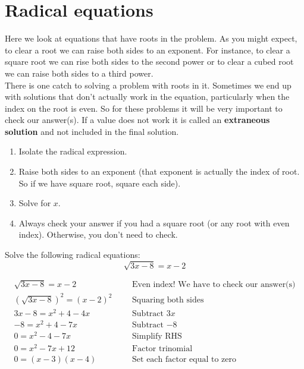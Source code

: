 \section{Radical equations}
Here we look at equations that have roots in the problem. As you might expect, to clear a root we can raise both sides to an exponent. For instance, to clear a square root
we can rise both sides to the second power or to clear a cubed root we can raise both sides to a third power. \\
There is one catch to solving a problem with roots in
it. Sometimes we end up with solutions that don’t actually work in the equation, particularly when the index on the root is even. So for these problems it will be very important to check our answer(s). If a value does not work it is called an \textbf{extraneous solution} and not included in the final solution.
\vspace{0.2cm}
\begin{tcolorbox}[
                    title=Steps to solve a radical equation, 
                    colback=blue!5!white,
                    colframe=blue!75!black,
                    fonttitle=\bfseries
                    ]
    \begin{enumerate}[1.]
        \item Isolate the radical expression.
        \item Raise both sides to an exponent (that exponent is actually the index of root. So if we have square root, square each side).
        \item Solve for $x$.
        \item Always check your answer if you had a square root (or any root with even index). Otherwise, you don't need to check.
    \end{enumerate}
\end{tcolorbox}
\begin{exa}
    Solve the following radical equations:
    \[
            \sqrt{3x-8}=x-2
    \]
\end{exa}
	\begin{align*}
		\sqrt{3x-8}=x-2&	 & &\text{Even index! We have to check our answer(s)}\\
		\left(\sqrt{3x-8}\right)^2=(x-2)^2&	 & &\text{Squaring both sides}\\
		3x-8=x^2+4-4x&  &    &\text{Subtract $3x$}\\
		-8 = x^2+4-7x&  &   &\text{Subtract $-8$}\\
		0=x^2-4-7x&     &   &\text{Simplify RHS}\\
		0=x^2-7x+12&    &   &\text{Factor trinomial}\\
		0=(x-3)(x-4)&   &   &\text{Set each factor equal to zero}
	\end{align*}
